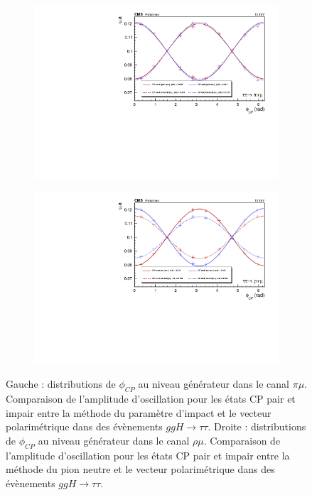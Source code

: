 \begin{figure}
  \begin{subfigure}[b]{0.5\linewidth}
    \centering
    \includegraphics[width=\linewidth]{Chapitre6/Images/PIMU/pimu_pvdpgen.pdf} 
    \caption*{} 
    \vspace{0.5ex}
  \end{subfigure}%
  \begin{subfigure}[b]{0.5\linewidth}
    \centering
    \includegraphics[width=\linewidth]{Chapitre6/Images/RHOMU/rhomu_pvdpgen.pdf} 
    \caption*{} 
    \vspace{0.5ex}
  \end{subfigure} 
\caption{Gauche : distributions de $\phi_{CP}$ au niveau générateur dans le canal $\pi\mu$. Comparaison de l'amplitude d'oscillation pour les états CP pair et impair entre la méthode du paramètre d'impact et le vecteur polarimétrique dans des évènements $ggH\to\tau\tau$. Droite : distributions de $\phi_{CP}$ au niveau générateur dans le canal $\rho\mu$. Comparaison de l'amplitude d'oscillation pour les états CP pair et impair entre la méthode du pion neutre et le vecteur polarimétrique dans des évènements $ggH\to\tau\tau$.}
\label{Xmugen}
\end{figure}

